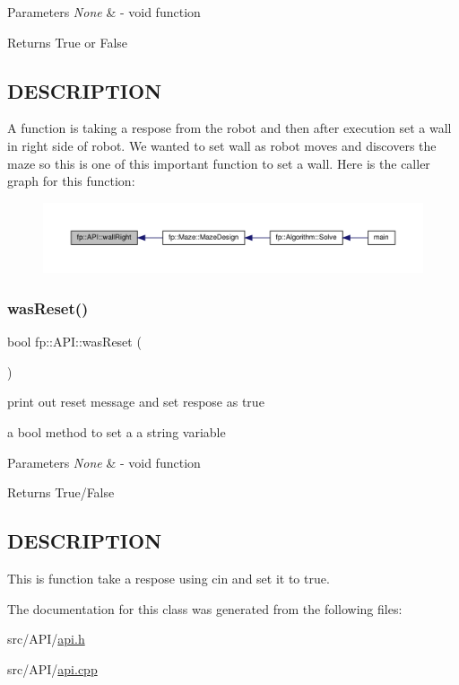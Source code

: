 \begin{DoxyParams}{Parameters}
{\em None} & -\/ void function \\
\hline
\end{DoxyParams}
\begin{DoxyReturn}{Returns}
True or False 
\end{DoxyReturn}
\hypertarget{_m_a_z_e_8h_DESCRIPTION}{}\subsection{D\+E\+S\+C\+R\+I\+P\+T\+I\+ON}\label{_m_a_z_e_8h_DESCRIPTION}
A function is taking a respose from the robot and then after execution set a wall in right side of robot. We wanted to set wall as robot moves and discovers the maze so this is one of this important function to set a wall. Here is the caller graph for this function\+:
\nopagebreak
\begin{figure}[H]
\begin{center}
\leavevmode
\includegraphics[width=350pt]{classfp_1_1_a_p_i_aeaebbd3b022bc0ed768dc3112ea1db94_icgraph}
\end{center}
\end{figure}
\mbox{\label{classfp_1_1_a_p_i_a390976eee05262068b7387f1421d906a}} 
\subsubsection{\texorpdfstring{was\+Reset()}{wasReset()}}
{\footnotesize\ttfamily bool fp\+::\+A\+P\+I\+::was\+Reset (\begin{DoxyParamCaption}{ }\end{DoxyParamCaption})\hspace{0.3cm}{\ttfamily [static]}}



print out reset message and set respose as true 

a bool method to set a a string variable


\begin{DoxyParams}{Parameters}
{\em None} & -\/ void function \\
\hline
\end{DoxyParams}
\begin{DoxyReturn}{Returns}
True/\+False 
\end{DoxyReturn}
\hypertarget{_m_a_z_e_8h_DESCRIPTION}{}\subsection{D\+E\+S\+C\+R\+I\+P\+T\+I\+ON}\label{_m_a_z_e_8h_DESCRIPTION}
This is function take a respose using cin and set it to true. 

The documentation for this class was generated from the following files\+:\begin{DoxyCompactItemize}
\item 
src/\+A\+P\+I/\hyperlink{api_8h}{api.\+h}\item 
src/\+A\+P\+I/\hyperlink{api_8cpp}{api.\+cpp}\end{DoxyCompactItemize}
